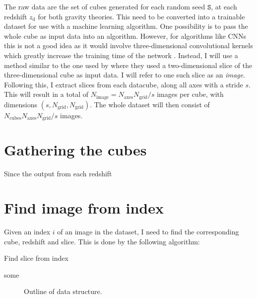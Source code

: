 %
%
The raw data are the set of cubes generated for each random seed $\mathtt{S}$, at each redshift $z_\mathrm{d}$ for both gravity theories. This need to be converted into a trainable dataset for use with a machine learning algorithm. One possibility is to pass the whole cube as input data into an algorithm. However, for algorithms like CNNs this is not a good idea as it would involve three-dimensional convolutional kernels which greatly increase the training time of the network . Instead, I will use a method similar to the one used by  where they used a two-dimensional slice of the three-dimensional cube as input data. I will refer to one such slice as an \textit{image}.  Following this, I extract slices from each datacube, along all axes with a stride $s$. This will result in a total of $N_\mathrm{image}=N_\mathrm{axes}N_\mathrm{grid}/s$ images per cube, with dimensions $(s, N_\mathrm{grid}, N_\mathrm{grid})$. The whole dataset will then consist of $N_\mathrm{cubes}N_\mathrm{axes}N_\mathrm{grid}/s$ images.
\section{Gathering the cubes}
    Since the output from each redshift

\section{Find image from index}
    Given an index $i$ of an image in the dataset, I need to find the corresponding cube, redshift and slice. This is done by the following algorithm:
    \begin{algorithm}
        \caption{Find slice from index}\label{algo:data:find_slice_from_index}
        \begin{algorithmic}
            \State some
        \end{algorithmic}
    \end{algorithm}



    \begin{figure}\label{fig:data:illustration_of_dataset}
        \centering
        
        \caption{Outline of data structure.}
    \end{figure}